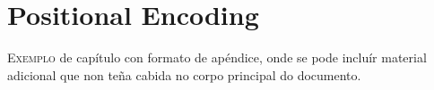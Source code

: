 \chapter{Positional Encoding}
\label{chap:Positional Encoding}

\lettrine{E}{xemplo} de capítulo con formato de apéndice, onde se pode
incluír material adicional que non teña cabida no corpo principal do
documento.